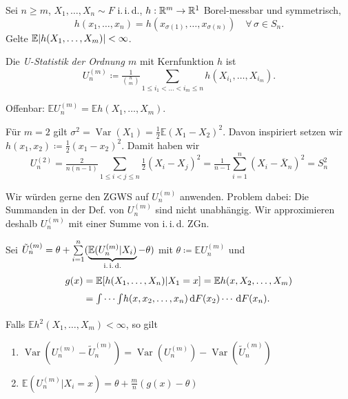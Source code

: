 \documentclass{cheat-sheet}
\newcommand{\E}{\mathbb{E}} %
\newcommand{\iid}{i.\,i.\,d.} %
\DeclareMathOperator{\var}{Var} %
\begin{document}

\begin{situation}
  Sei $n \geq m$, $X_1, \ldots, X_n \sim F$ \iid{}, $h : \mathbb{R}^m \to \mathbb{R}^1$ Borel-messbar und symmetrisch, \dh{}
  \[
    h(x_1, \ldots, x_n) = h(x_{\sigma(1)}, \ldots, x_{\sigma(n)}) \quad
    \forall \, \sigma \in S_n.
  \]
  Gelte $\E \abs{h(X_1, \ldots, X_m)} < \infty$.
\end{situation}

\begin{defn}
  Die \emph{U-Statistik der Ordnung $m$} mit Kernfunktion $h$ ist
  \[ U_n^{(m)} \coloneqq \tfrac{1}{\binom{n}{m}} \sum_{1 \leq i_1 < \ldots < i_m \leq n} h(X_{i_1}, \ldots, X_{i_m}). \]
\end{defn}

\begin{bem}
  Offenbar: $\E U_n^{(m)} = \E h(X_1, \ldots, X_m)$.
\end{bem}

\begin{bsp}
  Für $m=2$ gilt $\sigma^2 = \var(X_1) = \tfrac{1}{2} \E (X_1 - X_2)^2$.
  Davon inspiriert setzen wir $h(x_1, x_2) \coloneqq \tfrac{1}{2}(x_1 - x_2)^2$.
  Damit haben wir
  \[
    U_n^{(2)} = \tfrac{2}{n (n-1)} \sum_{1 \leq i < j \leq n} \tfrac{1}{2} (X_i - X_j)^2
    = \tfrac{1}{n-1} \sum_{i=1}^n (X_i - \overline{X}_n)^2 = S_n^2
  \]
\end{bsp}

\begin{ziel}
  Wir würden gerne den ZGWS auf $U_n^{(m)}$ anwenden.
  Problem dabei: Die Summanden in der Def. von $U_n^{(m)}$ sind nicht unabhängig.
  Wir approximieren deshalb $U_n^{(m)}$ mit einer Summe von \iid{} ZGn.
\end{ziel}

\begin{lem}
  Sei \enspace
  $\tilde{U}_n^{(m)} = \theta + \sum_{i=1}^n (\underbrace{\E(U_n^{(m)} | X_i)}_{\text{\iid{}}} - \theta)$ \enspace
  mit $\theta \coloneqq \E U_n^{(m)}$ und
  \begin{align*}
    g(x) & = \E[h(X_1, \ldots, X_n) | X_1 = x ] = \E h(x, X_2, \ldots, X_m) \\
    & = \Int{}{}{\cdots \Int{}{}{h(x, x_2, \ldots, x_n)}{F(x_2)} \cdots}{F(x_n)}.
  \end{align*}
  Falls $\E h^2(X_1, \ldots, X_m) < \infty$, so gilt
  \begin{enumerate}[label=(\arabic*), itemindent=6pt]
    \item $\var(U_n^{(m)} - \tilde{U}_n^{(m)}) = \var(U_n^{(m)}) - \var(\tilde{U}_n^{(m)})$
    \item $\E (U_n^{(m)} | X_i = x) = \theta + \tfrac{m}{n} (g(x) - \theta)$
  \end{enumerate}
\end{lem}
\end{document}
